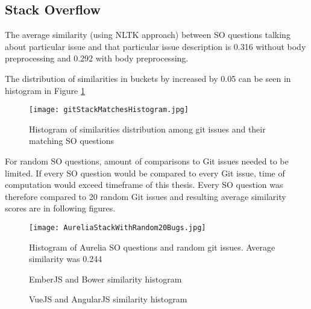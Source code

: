 \subsection{Stack Overflow}
The average similarity (using NLTK approach) between SO questions talking about particular issue and that particular issue description is 0.316 without body preprocessing and 0.292 with body preprocessing.

The distribution of similarities in buckets by increased by 0.05 can be seen in histogram in Figure \ref{fig:GitStackMatchesHistogram}

\begin{figure}[H]%
    \centering
	\texttt{[image: gitStackMatchesHistogram.jpg]}
    \caption{Histogram of similarities distribution among git issues and their matching SO questions}%
    \label{fig:GitStackMatchesHistogram}%
\end{figure}

For random SO questions, amount of comparisons to Git issues needed to be limited. If every SO question would be compared to every Git issue, time of computation would exceed timeframe of this thesis. Every SO question was therefore compared to 20 random Git issues and resulting average similarity scores are in following figures.

\begin{figure}[H]%
    \centering
	\texttt{[image: AureliaStackWithRandom20Bugs.jpg]}
    \caption{Histogram of Aurelia SO questions and random git issues. Average similarity was 0.244}%
    \label{fig:AureliaStackWithRandom3Bugs}%
\end{figure}

\begin{figure}[H]%
    \centering
    \qquad
    \caption{EmberJS and Bower similarity histogram}%
    \label{fig:BowerEmberWithRandom3Bugs}%
\end{figure}

\begin{figure}[H]%
    \centering
    \qquad
    \caption{VueJS and AngularJS similarity histogram}%
    \label{fig:VueAngularWithRandom3Bugs}%
\end{figure}



